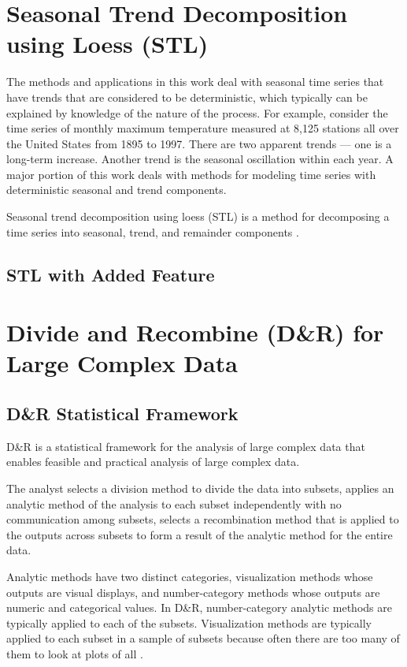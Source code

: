 \section{Seasonal Trend Decomposition using Loess (STL)}
\label{sec:stl}
The methods and applications in this work deal with seasonal time series
that have trends that are considered to be deterministic, which typically can be
explained by knowledge of the nature of the process. For example, consider the
time series of monthly maximum temperature measured at 8,125 stations all over 
the United States from 1895 to 1997. There are two apparent trends --- one is a
long-term increase. Another trend is the seasonal oscillation within each year.
A major portion of this work deals with methods for modeling time series with
deterministic seasonal and trend components.

Seasonal trend decomposition using loess (STL) is a method for decomposing a time
series into seasonal, trend, and remainder components \cite{Cleveland:1990}.

\subsection{STL with Added Feature}

\section{Divide and Recombine (D\&R) for Large Complex Data}

\subsection{D\&R Statistical Framework}

D\&R \cite{Guha:2012} is a statistical framework for the analysis of large complex
data that enables feasible and practical analysis of large complex data. 

The 
analyst selects a division method to divide the data into subsets, applies an 
analytic method of the analysis to each subset independently with no communication
among subsets, selects a recombination method that is applied to the outputs 
across subsets to form a result of the analytic method for the entire data.

Analytic methods have two distinct categories, visualization methods whose outputs
are visual displays, and number-category methods whose outputs are numeric and 
categorical values. In D\&R, number-category analytic methods are typically applied
to each of the subsets. Visualization methods are typically applied to each subset 
in a sample of subsets because often there are too many of them to look at plots 
of all \cite{Hafen:2013}.
 
